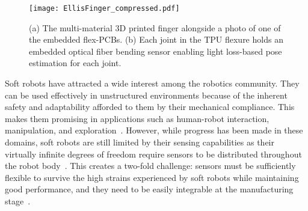 \begin{figure}
    \centering
    \texttt{[image: EllisFinger\_compressed.pdf]}
    \caption{(a) The multi-material 3D printed finger alongside a photo of one of the embedded flex-PCBs. (b) Each joint in the TPU flexure holds an embedded optical fiber bending sensor enabling light loss-based pose estimation for each joint.}
    \label{fig:opening_figure}
    \vspace{-1.5em}
\end{figure}

Soft robots have attracted a wide interest among the robotics community. They can be used effectively in unstructured environments because of the inherent safety and adaptability afforded to them by their mechanical compliance. This makes them promising in applications such as human-robot interaction, manipulation, and exploration~\cite{polygerinos2017soft, shorthose2022design, becker2022active, brown2010universal, ng2023untethered, zhang2023progress}. However, while progress has been made in these domains, soft robots are still limited by their sensing capabilities as their virtually infinite degrees of freedom require sensors to be distributed throughout the robot body~\cite{toward_perceptive_soft_robots_wang}. This creates a two-fold challenge: sensors must be sufficiently flexible to survive the high strains experienced by soft robots while maintaining good performance, and they need to be easily integrable at the manufacturing stage~\cite{flexible_sensing_qu}.

